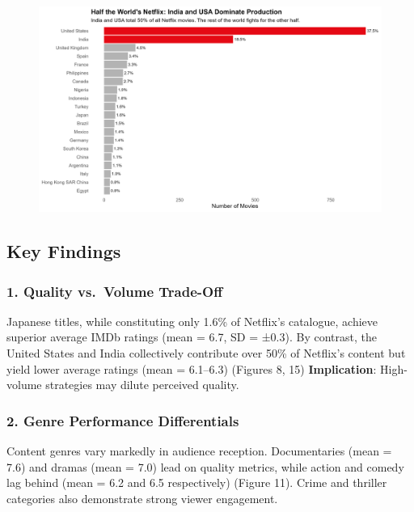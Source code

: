 \documentclass[
  man,floatsintext]{apa6}
\begin{document}
\begin{figure}

{\centering \includegraphics[width=0.9\linewidth]{../Question3/Results/top20creators} 

}

\caption{ }\label{fig:audienceengage-9}
\end{figure}

\subsection{Key Findings}\label{key-findings}

\subsubsection{1. Quality vs.~Volume Trade-Off}\label{quality-vs.-volume-trade-off}

Japanese titles, while constituting only 1.6\% of Netflix's catalogue, achieve superior average IMDb ratings (mean = 6.7, SD = ±0.3). By contrast, the United States and India collectively contribute over 50\% of Netflix's content but yield lower average ratings (mean = 6.1--6.3) (Figures 8, 15)
\textbf{Implication}: High-volume strategies may dilute perceived quality.

\subsubsection{2. Genre Performance Differentials}\label{genre-performance-differentials}

Content genres vary markedly in audience reception. Documentaries (mean = 7.6) and dramas (mean = 7.0) lead on quality metrics, while action and comedy lag behind (mean = 6.2 and 6.5 respectively) (Figure 11). Crime and thriller categories also demonstrate strong viewer engagement.
\end{document}
